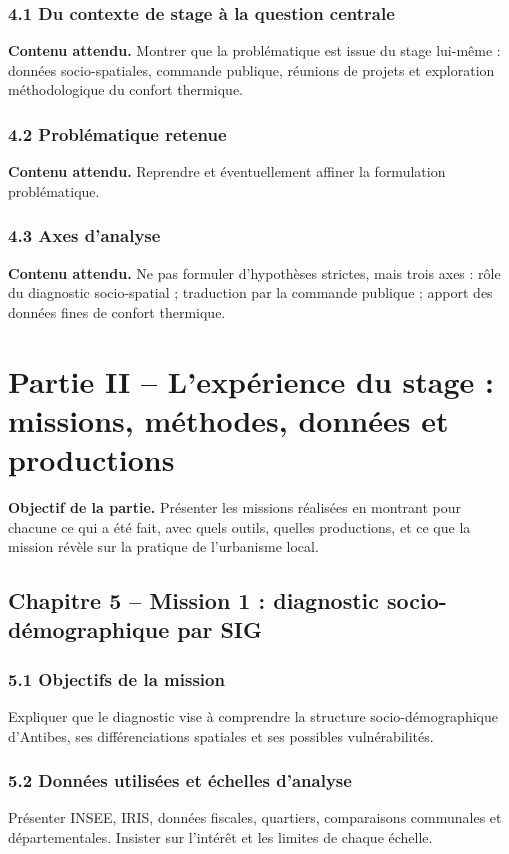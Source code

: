\documentclass[11pt,a4paper]{article}
\begin{document}
\subsubsection{4.1 Du contexte de stage à la question centrale}
\textbf{Contenu attendu.} Montrer que la problématique est issue du stage lui-même : données socio-spatiales, commande publique, réunions de projets et exploration méthodologique du confort thermique.

\subsubsection{4.2 Problématique retenue}
\textbf{Contenu attendu.} Reprendre et éventuellement affiner la formulation problématique.

\subsubsection{4.3 Axes d'analyse}
\textbf{Contenu attendu.} Ne pas formuler d'hypothèses strictes, mais trois axes : rôle du diagnostic socio-spatial ; traduction par la commande publique ; apport des données fines de confort thermique.

\section{Partie II -- L'expérience du stage : missions, méthodes, données et productions}

\textbf{Objectif de la partie.} Présenter les missions réalisées en montrant pour chacune ce qui a été fait, avec quels outils, quelles productions, et ce que la mission révèle sur la pratique de l'urbanisme local.

\subsection{Chapitre 5 -- Mission 1 : diagnostic socio-démographique par SIG}

\subsubsection{5.1 Objectifs de la mission}
Expliquer que le diagnostic vise à comprendre la structure socio-démographique d'Antibes, ses différenciations spatiales et ses possibles vulnérabilités.

\subsubsection{5.2 Données utilisées et échelles d'analyse}
Présenter INSEE, IRIS, données fiscales, quartiers, comparaisons communales et départementales. Insister sur l'intérêt et les limites de chaque échelle.
\end{document}
